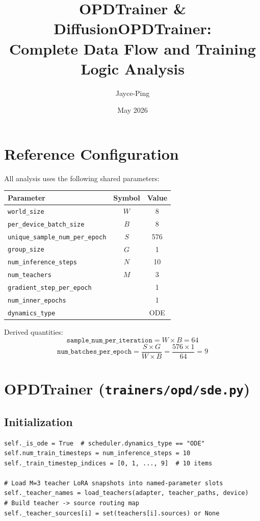 \documentclass[11pt]{article}
\title{OPDTrainer \& DiffusionOPDTrainer:\\Complete Data Flow and Training Logic Analysis}
\author{Jayce-Ping}
\date{May 2026}
\begin{document}
\maketitle
\tableofcontents
\newpage

\section{Reference Configuration}

All analysis uses the following shared parameters:

\begin{table}[h]
\centering
\begin{tabular}{lcc}
\toprule
Parameter & Symbol & Value \\
\midrule
\texttt{world\_size} & $W$ & 8 \\
\texttt{per\_device\_batch\_size} & $B$ & 8 \\
\texttt{unique\_sample\_num\_per\_epoch} & $S$ & 576 \\
\texttt{group\_size} & $G$ & 1 \\
\texttt{num\_inference\_steps} & $N$ & 10 \\
\texttt{num\_teachers} & $M$ & 3 \\
\texttt{gradient\_step\_per\_epoch} & & 1 \\
\texttt{num\_inner\_epochs} & & 1 \\
\texttt{dynamics\_type} & & ODE \\
\bottomrule
\end{tabular}
\end{table}

Derived quantities:
\[
\texttt{sample\_num\_per\_iteration} = W \times B = 64
\]
\[
\texttt{num\_batches\_per\_epoch} = \frac{S \times G}{W \times B} = \frac{576 \times 1}{64} = 9
\]

\section{OPDTrainer (\texttt{trainers/opd/sde.py})}

\subsection{Initialization}

\begin{lstlisting}
self._is_ode = True  # scheduler.dynamics_type == "ODE"
self.num_train_timesteps = num_inference_steps = 10
self._train_timestep_indices = [0, 1, ..., 9]  # 10 items

# Load M=3 teacher LoRA snapshots into named-parameter slots
self._teacher_names = load_teachers(adapter, teacher_paths, device)
# Build teacher -> source routing map
self._teacher_sources[i] = set(teachers[i].sources) or None
\end{lstlisting}
\end{document}
